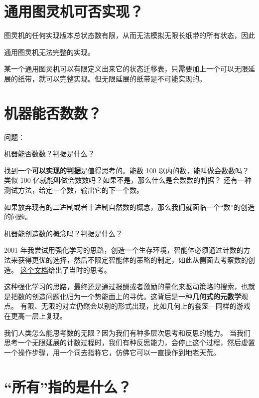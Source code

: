 \documentclass[a4paper,12pt]{article}
\numberwithin{problem}{section}
\numberwithin{definition}{section}
\numberwithin{lemma}{section}
\numberwithin{proposition}{section}
\numberwithin{theorem}{section}
\numberwithin{grammar}{section}
\numberwithin{program}{section}
\numberwithin{convention}{section}
\numberwithin{corollary}{section}
\begin{document}
\section{通用图灵机可否实现？}

图灵机的任何实现版本总状态数有限，从而无法模拟无限长纸带的所有状态，因此
\begin{displayquote}
通用图灵机无法完整的实现。
\end{displayquote}

某一个通用图灵机可以有限定义出来它的状态迁移表，只需要加上一个可以无限延展的纸带，就可以完整实现。但无限延展的纸带是不可能实现的。

\section{机器能否数数？}

问题：
\begin{displayquote}
机器能否数数？判据是什么？
\end{displayquote}

找到一个\textbf{可以实现的判据}是值得思考的。能数 100 以内的数，能叫做会数数吗？类似 100 亿就能叫做会数数吗？如果不是，那么什么是会数数的判据？
还有一种测试方法，给定一个数，输出它的下一个数。

如果放弃现有的二进制或者十进制自然数的概念，那么我们就面临一个“数”的创造的问题。

\begin{displayquote}
机器能创造数的概念吗？判据是什么？
\end{displayquote}

2001 年我尝试用强化学习的思路，创造一个生存环境，智能体必须通过计数的方法来获得更优的选择，然后不限定智能体的策略的制定，如此从侧面去考察数的创造。
\href{https://onecorner.org/curiosity/numbers/numbers.pdf}{这个文档}给出了当时的思考。

这种强化学习的思路，最终还是通过报酬或者激励的量化来驱动策略的搜索，也就是把数的创造问题化归为一个势能面上的寻优。这背后是一种\textbf{几何式的元数学}观点。
有限、无限的对立仍然会以别的形式出现，比如几何上的套笼—同样的游戏在更高一层上复现。

我们人类怎么能思考数的无限？因为我们有种多层次思考和反思的能力。
当我们思考一个无限延展的计数过程时，我们有种反思能力，会停止这个过程，然后虚置一个操作步骤，用一个词去指称它，仿佛它可以一直操作到地老天荒。

\section{“所有”指的是什么？}
\end{document}
